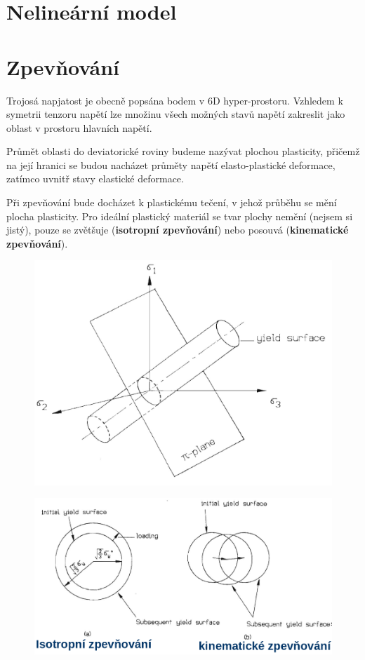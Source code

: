 \documentclass{article}
\begin{document}
	\section{Nelineární model}

	\section{Zpevňování}
	Trojosá napjatost je obecně popsána bodem v 6D hyper-prostoru. Vzhledem k symetrii tenzoru napětí lze množinu všech možných stavů napětí zakreslit jako oblast v prostoru hlavních napětí.

	Průmět oblasti do deviatorické roviny budeme nazývat plochou plasticity, přičemž na její hranici se budou nacházet průměty napětí elasto-plastické deformace, zatímco uvnitř stavy elastické deformace.

	Při zpevňování bude docházet k plastickému tečení, v jehož průběhu se mění plocha plasticity. Pro ideální plastický materiál se tvar plochy nemění (nejsem si jistý), pouze se zvětšuje (\textbf{isotropní zpevňování}) nebo posouvá (\textbf{kinematické zpevňování}).
	\begin{figure}[h!]
		\centering
		\includegraphics[width=.5\linewidth]{figs/PlochaPlasticity.png}
	\end{figure}
	\begin{figure}[h!]
		\centering
		\includegraphics[width=.5\linewidth]{figs/Zpevnovani.png}
	\end{figure}
\end{document}
